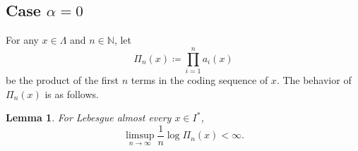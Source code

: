 \documentclass[12pt,reqno]{amsart}
\renewcommand{\=}{\coloneqq}
\theoremstyle{plain}
\newtheorem{lemma}[theorem]{Lemma}
\begin{document}
\subsection{Case $\alpha =0$}

For any $x\in \Lambda$ and $n \in \mathbb N$, let
\begin{equation}\label{Pin(x)}
 \Pi_{n}(x) \coloneqq\prod^n_{i=1}a_i(x)
\end{equation}
be the product of the first $n$ terms in the coding sequence of $x$. The behavior of $\Pi_{n}(x)$ is as follows.


\begin{lemma}\label{lem:Acase0}
For Lebesgue almost every $x\in I^*$,
\begin{equation}\label{ineq:sumak}
\limsup_{n \to \infty} \frac{1}{n}\log  \Pi_{n}(x)<\infty.
\end{equation}
\end{lemma}
\end{document}

